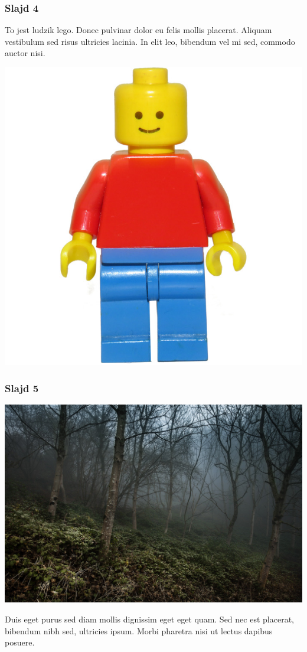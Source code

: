 \documentclass{beamer}
\begin{document}
\begin{frame}
\frametitle{Slajd 4}
\begin{minipage}{0.5\textwidth}
  To jest ludzik lego. Donec pulvinar dolor eu felis mollis placerat. Aliquam vestibulum sed risus ultricies lacinia. In elit leo, bibendum vel mi sed, commodo auctor nisi. 
\end{minipage}%
\begin{minipage}{0.5\textwidth}
  \includegraphics[width=\linewidth]{lego.jpeg}
\end{minipage}
\end{frame}

\begin{frame}
\frametitle{Slajd 5}
\begin{minipage}{0.5\textwidth}
  \includegraphics[width=\linewidth]{foggy.jpg}
\end{minipage}%
\begin{minipage}{0.5\textwidth}
  Duis eget purus sed diam mollis dignissim eget eget quam. Sed nec est placerat, bibendum nibh sed, ultricies ipsum. Morbi pharetra nisi ut lectus dapibus posuere.
\end{minipage}
\end{frame}
\end{document}
